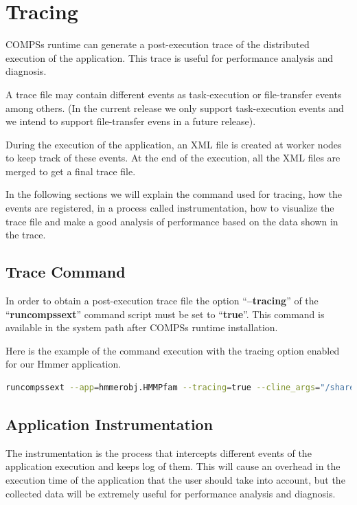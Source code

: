 \section{Tracing}
\label{sec:Tracing}

COMPSs runtime can generate a post-execution trace of the distributed execution of the application. 
This trace is useful for performance analysis and diagnosis.

A trace file may contain different events as task-execution or file-transfer events among others. 
(In the current release we only support task-execution events and we intend to support file-transfer evens in a future release).

During the execution of the application, an XML file is created at worker nodes to keep track of 
these events. At the end of the execution, all the XML files are merged to get a final trace file.

In the following sections we will explain the command used for tracing, how the events are registered, 
in a process called instrumentation, how to visualize the trace file and make a good analysis of 
performance based on the data shown in the trace.

\subsection{Trace Command}
In order to obtain a post-execution trace file the option ``{\bf --tracing}'' of the 
``{\bf runcompssext}'' command script must be set to ``{\bf true}''. This command is available in 
the system path after COMPSs runtime installation.

Here is the example of the command execution with the tracing option enabled for our Hmmer application.

\begin{lstlisting}[language=bash]
runcompssext --app=hmmerobj.HMMPfam --tracing=true --cline_args="/sharedDisk/Hmmer/smart.HMMs.bin /sharedDisk/Hmmer/256seq   /home/user/out.txt 2 8 -A 222"
\end{lstlisting}
 

\subsection{Application Instrumentation}

The instrumentation is the process that intercepts different events of the application execution 
and keeps log of them. This will cause an overhead in the execution time of the application that 
the user should take into account, but the collected data will be extremely useful for performance 
analysis and diagnosis.

